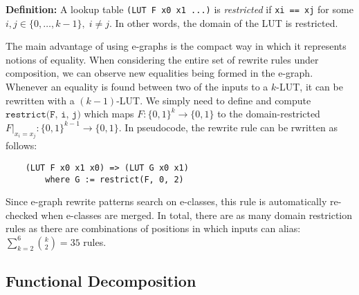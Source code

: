 \textbf{Definition:} A lookup table \texttt{(LUT F x0 x1 ...)} is \textit{restricted} if \texttt{xi == xj} for some $ i, j \in \{0, \ldots, k-1\}, \; i \neq j$.
In other words, the domain of the LUT is restricted.

The main advantage of using e-graphs is the compact way in which it represents
notions of equality. When considering the entire set of rewrite rules under
composition, we can observe new equalities being formed in the e-graph.
Whenever an equality is found between two of the inputs to a $k$-LUT, it can be
rewritten with a $(k-1)$-LUT. We simply need to define and compute
$\texttt{restrict(F, i, j)}$ which maps $F : \{0, 1\}^k \rightarrow \{ 0, 1\}$
to the domain-restricted $F \vert_{x_i = x_j} : \{0, 1\}^{k-1} \rightarrow \{
    0, 1\}$. In pseudocode, the rewrite rule can be rwritten as follows:

\begin{verbatim}
    (LUT F x0 x1 x0) => (LUT G x0 x1)
        where G := restrict(F, 0, 2)
\end{verbatim}

Since e-graph rewrite patterns search on e-classes, this rule is automatically
re-checked when e-classes are merged. In total, there are as many domain
restriction rules as there are combinations of positions in which inputs can
alias: $\sum_{k=2}^{6} \binom{k}{2} = 35$ rules.

\subsection{Functional Decomposition} \label{sec:rewrites:decomp}
